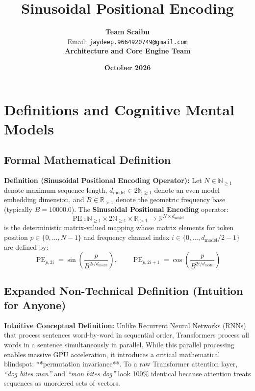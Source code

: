 \documentclass[11pt,a4paper]{article}
\title{\textbf{Sinusoidal Positional Encoding}}
\author{\textbf{Team Scaibu} \\ \small Email: \texttt{jaydeep.9664920749@gmail.com} \\ \small \textbf{Architecture and Core Engine Team}}
\date{\textbf{October 2026}}
\theoremstyle{definition}
\begin{document}
\maketitle

\section{Definitions and Cognitive Mental Models}

\subsection{Formal Mathematical Definition}
\textbf{Definition (Sinusoidal Positional Encoding Operator):}
Let $N \in \mathbb{N}_{\ge 1}$ denote maximum sequence length, $d_{\text{model}} \in 2\mathbb{N}_{\ge 1}$ denote an even model embedding dimension, and $B \in \mathbb{R}_{> 1}$ denote the geometric frequency base (typically $B = 10000.0$).
The \textbf{Sinusoidal Positional Encoding} operator:
{\boldmath
\begin{equation}
\operatorname{PE}: \mathbb{N}_{\ge 1} \times 2\mathbb{N}_{\ge 1} \times \mathbb{R}_{> 1} \longrightarrow \mathbb{R}^{N \times d_{\text{model}}}
\end{equation}
}
is the deterministic matrix-valued mapping whose matrix elements for token position $p \in \{0, \dots, N-1\}$ and frequency channel index $i \in \{0, \dots, d_{\text{model}}/2 - 1\}$ are defined by:
{\boldmath
\begin{equation}
\operatorname{PE}_{p, 2i} = \sin\left(\frac{p}{B^{2i / d_{\text{model}}}}\right), \qquad \operatorname{PE}_{p, 2i+1} = \cos\left(\frac{p}{B^{2i / d_{\text{model}}}}\right)
\end{equation}
}

\subsection{Expanded Non-Technical Definition (Intuition for Anyone)}
\textbf{Intuitive Conceptual Definition:}
Unlike Recurrent Neural Networks (RNNs) that process sentences word-by-word in sequential order, Transformers process all words in a sentence simultaneously in parallel. While this parallel processing enables massive GPU acceleration, it introduces a critical mathematical blindspot: **permutation invariance**. To a raw Transformer attention layer, \emph{``dog bites man''} and \emph{``man bites dog''} look 100\% identical because attention treats sequences as unordered sets of vectors.
\end{document}
